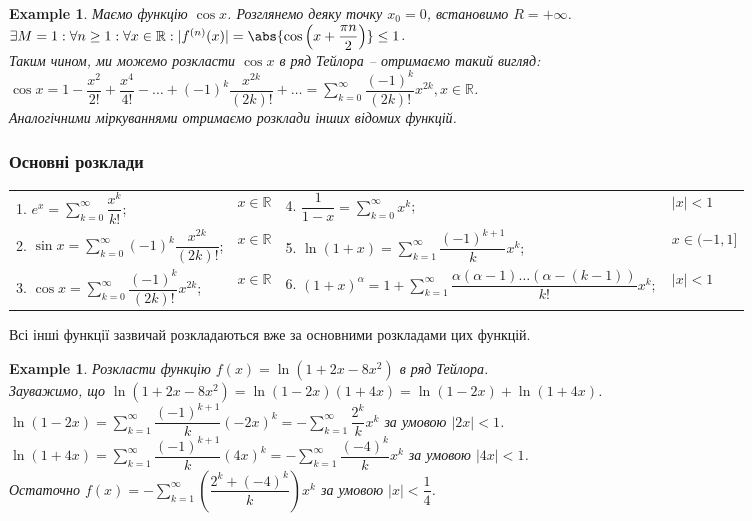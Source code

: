 \documentclass[a4paper, 10pt]{article}
\def\huge{\displaystyle}
\theoremstyle{theoremdd}
\theoremstyle{theoremdd}
\theoremstyle{theoremdd}
\theoremstyle{theoremdd}
\theoremstyle{theoremdd}
\newtheorem{example}[theorem]{Example}
\theoremstyle{theoremdd}
\theoremstyle{theoremdd}
\theoremstyle{theoremdd}
\theoremstyle{theoremdd}
\newtheorem{corollary}[theorem]{Corollary}
\begin{document}
\iffalse
\begin{corollary}
Ряд Тейлора для суми степеневого ряду співпадають с самим степеневим рядом на області збіжності.
\end{corollary}
\fi

\begin{example}
Маємо функцію $\cos x$. Розглянемо деяку точку $x_0 = 0$, встановимо $R = +\infty$.\\
$\exists M = 1: \forall n \geq 1: \forall x \in \mathbb{R}: |f^{(n)}(x)| = \abs{\cos \left( x + \dfrac{\pi n}{2} \right)} \leq 1$.\\
Таким чином, ми можемо розкласти $\cos x$ в ряд Тейлора -- отримаємо такий вигляд:\\
$\cos x = 1 - \dfrac{x^2}{2!} + \dfrac{x^4}{4!} - \dots + (-1)^k \dfrac{x^{2k}}{(2k)!} + \dots = \huge\sum_{k=0}^\infty \dfrac{(-1)^k}{(2k)!} x^{2k}, x \in \mathbb{R}$.\\
Аналогічними міркуваннями отримаємо розклади інших відомих функцій.
\end{example}

\subsubsection*{Основні розклади}
\begin{tabular}{ll|ll}
1. $e^x = \huge\sum_{k=0}^\infty \dfrac{x^k}{k!}$; & $x \in \mathbb{R}$ & 4. $\dfrac{1}{1-x} = \huge\sum_{k=0}^\infty x^k$; & $ |x| < 1$\\
2. $\sin x = \huge\sum_{k=0}^\infty (-1)^{k} \dfrac{x^{2k}}{(2k)!}$; & $x \in \mathbb{R}$ & 5. $\ln (1+x) = \huge\sum_{k=1}^\infty \dfrac{(-1)^{k+1}}{k} x^k$; & $x \in (-1,1]$\\
3. $\cos x = \huge\sum_{k=0}^\infty \dfrac{(-1)^k}{(2k)!} x^{2k}$; & $x \in \mathbb{R}$ & 6. $(1+x)^\alpha = 1 + \huge\sum_{k=1}^\infty \dfrac{\alpha (\alpha-1) \dots (\alpha - (k-1))}{k!}x^k;$ & $|x| < 1$
\end{tabular}

Всі інші функції зазвичай розкладаються вже за основними розкладами цих функцій.

\begin{example}
Розкласти функцію $f(x) = \ln (1+2x-8x^2)$ в ряд Тейлора.\\
Зауважимо, що $\ln (1+2x-8x^2) = \ln (1-2x)(1+4x) = \ln (1-2x) + \ln (1+4x)$.\\
$\ln (1-2x) =  \huge\sum_{k=1}^\infty \dfrac{(-1)^{k+1}}{k}(-2x)^k =- \sum_{k=1}^\infty \dfrac{2^k}{k}x^k$ за умовою $|2x| < 1$.\\
$\ln (1+4x) = \huge\sum_{k=1}^\infty \dfrac{(-1)^{k+1}}{k} (4x)^k = -\sum_{k=1}^\infty \dfrac{(-4)^k}{k}x^k$ за умовою $|4x| < 1$.\\
Остаточно $f(x) = -\huge\sum_{k=1}^\infty \left( \dfrac{2^k+(-4)^k}{k} \right) x^k$ за умовою $|x| < \dfrac{1}{4}$.
\end{example}
\newpage
\fi
\end{document}
